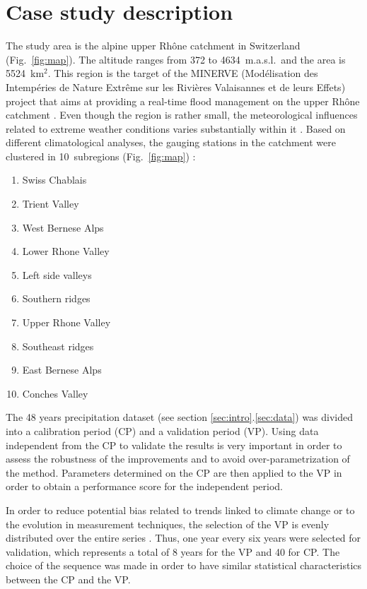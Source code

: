 \documentclass[5p]{elsarticle}
\begin{document}
\section{Case study description}
\label{sec:case_study}

The study area is the alpine upper Rh\^{o}ne catchment in Switzerland (Fig.\ \ref{fig:map}). The altitude ranges from 372 to 4634~m.a.s.l.\ and the area is 5524~km$^{2}$. This region is the target of the MINERVE (Mod\'{e}lisation des Intemp\'{e}ries de Nature Extr\^{e}me sur les Rivi\`{e}res Valaisannes et de leurs Effets) project that aims at providing a real-time flood management on the upper Rh\^{o}ne catchment \citep{GarciaHernandez2009b}. Even though the region is rather small, the meteorological influences related to extreme weather conditions varies substantially within it \citep[see][]{Horton2012}. Based on different climatological analyses, the gauging stations in the catchment were clustered in 10~subregions (Fig.\ \ref{fig:map}) :

\begin{enumerate}
	\item Swiss Chablais
	\item Trient Valley
	\item West Bernese Alps
	\item Lower Rhone Valley
	\item Left side valleys
	\item Southern ridges
	\item Upper Rhone Valley
	\item Southeast ridges
	\item East Bernese Alps
	\item Conches Valley
\end{enumerate}

The 48 years precipitation dataset (see section \ref{sec:intro}.\ref{sec:data}) was divided into a calibration period (CP) and a validation period (VP). Using data independent from the CP to validate the results is very important in order to assess the robustness of the improvements and to avoid over-parametrization of the method. Parameters determined on the CP are then applied to the VP in order to obtain a performance score for the independent period.

In order to reduce potential bias related to trends linked to climate change or to the evolution in measurement techniques, the selection of the VP is evenly distributed over the entire series \citep{BenDaoud2010}. Thus, one year every six years were selected for validation, which represents a total of 8 years for the VP and 40 for CP. The choice of the sequence was made in order to have similar statistical characteristics between the CP and the VP.
\end{document}
